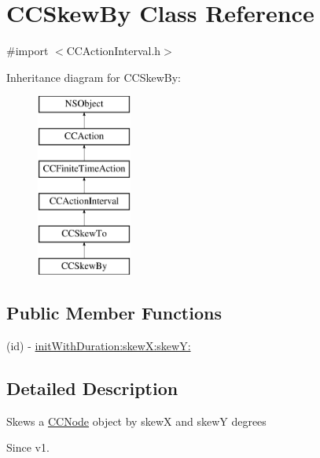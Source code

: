 \hypertarget{interface_c_c_skew_by}{\section{C\-C\-Skew\-By Class Reference}
\label{interface_c_c_skew_by}
}


{\ttfamily \#import $<$C\-C\-Action\-Interval.\-h$>$}

Inheritance diagram for C\-C\-Skew\-By\-:\begin{figure}[H]
\begin{center}
\leavevmode
\includegraphics[height=6.000000cm]{interface_c_c_skew_by}
\end{center}
\end{figure}
\subsection*{Public Member Functions}
\begin{DoxyCompactItemize}
\item 
(id) -\/ \hyperlink{interface_c_c_skew_by_ad325540195e7da22ea15abd163c7c7fb}{init\-With\-Duration\-:skew\-X\-:skew\-Y\-:}
\end{DoxyCompactItemize}


\subsection{Detailed Description}
Skews a \hyperlink{class_c_c_node}{C\-C\-Node} object by skew\-X and skew\-Y degrees \begin{DoxySince}{Since}
v1. 
\end{DoxySince}


